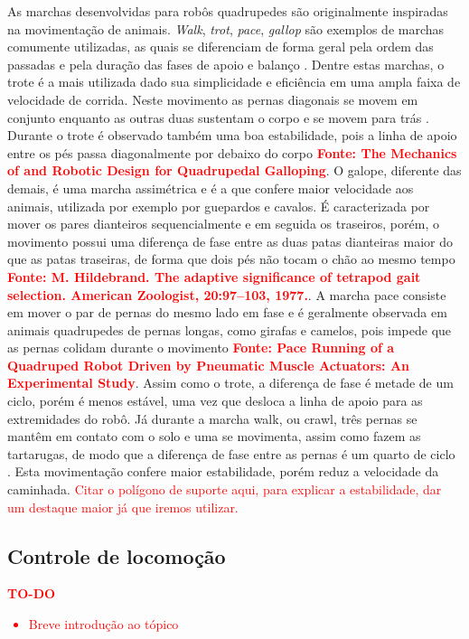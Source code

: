 \documentclass[../main.tex]{subfiles}
\begin{document}
  As marchas desenvolvidas para robôs quadrupedes são originalmente inspiradas na movimentação de animais. \textit{Walk}, \textit{trot}, \textit{pace}, \textit{gallop} são exemplos de marchas comumente utilizadas, as quais se diferenciam de forma geral pela ordem das passadas e pela duração das fases de apoio e balanço \cite{Yan2021}. Dentre estas marchas, o trote é a mais utilizada dado sua simplicidade e eficiência em uma ampla faixa de velocidade de corrida. Neste movimento as pernas diagonais se movem em conjunto enquanto as outras duas sustentam o corpo e se movem para trás \cite{X.118}. Durante o trote é observado também uma boa estabilidade, pois a linha de apoio entre os pés passa diagonalmente por debaixo do corpo \textbf{\textcolor{red}{Fonte: The Mechanics of and Robotic Design for Quadrupedal Galloping}}. O galope, diferente das demais, é uma marcha assimétrica e é a que confere maior velocidade aos animais, utilizada por exemplo por guepardos e cavalos. É caracterizada por mover os pares dianteiros sequencialmente e em seguida os traseiros, porém, o movimento possui uma diferença de fase entre as duas patas dianteiras maior do que as patas traseiras, de forma que dois pés não tocam o chão ao mesmo tempo \textbf{\textcolor{red}{Fonte: M. Hildebrand. The adaptive significance of tetrapod gait selection. American Zoologist, 20:97–103, 1977.}}. A marcha pace consiste em mover o par de pernas do mesmo lado em fase e é geralmente observada em animais quadrupedes de pernas longas, como girafas e camelos, pois impede que as pernas colidam durante o movimento \textbf{\textcolor{red}{Fonte: Pace Running of a Quadruped Robot Driven by Pneumatic Muscle Actuators: An Experimental Study}}. Assim como o trote, a diferença de fase é metade de um ciclo, porém é menos estável, uma vez que desloca a linha de apoio para as extremidades do robô. Já durante a marcha walk, ou crawl, três pernas se mantêm em contato com o solo e uma se movimenta, assim como fazem as tartarugas, de modo que a diferença de fase entre as pernas é um quarto de ciclo \cite{X.110}. Esta movimentação confere maior estabilidade, porém reduz a velocidade da caminhada. \textcolor{red}{Citar o polígono de suporte aqui, para explicar a estabilidade, dar um destaque maior já que iremos utilizar.}


  \subsection{Controle de locomoção}
  \textcolor{red}{\textbf{TO-DO}
  \begin{itemize}
    \item Breve introdução ao tópico
  \end{itemize}
  }
\end{document}
